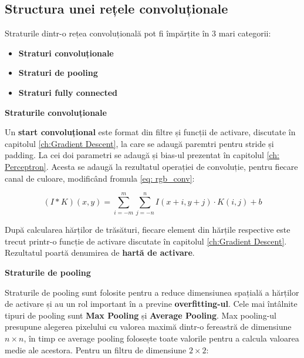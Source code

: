 \subsection{Structura unei rețele convoluționale}

Straturile dintr-o rețea convoluțională pot fi împărțite în 3 mari categorii:

\begin{itemize}
    \item \textbf{Straturi convoluționale}
    \item \textbf{Straturi de pooling}
    \item \textbf{Straturi fully connected}
\end{itemize}

\textbf{Straturile convoluționale}

Un \textbf{start convoluțional} este format din filtre și funcții de activare, discutate în capitolul \ref{ch:Gradient Descent}, la care se adaugă paremtri pentru stride și padding. La cei doi parametri se adaugă și bias-ul prezentat în capitolul \ref{ch: Perceptron}. Acesta se adaugă la rezultatul operației de convoluție, pentru fiecare canal de culoare, modificând fromula \ref{eq: rgb_conv}: 

\begin{equation}
    (I * K)(x, y) = \sum_{i=-m}^{m} \sum_{j=-n}^{n} I(x+i, y+j) \cdot K(i, j) + b
\end{equation}

După calcularea hărților de trăsături, fiecare element din hărțile respective este trecut printr-o funcție de activare discutate în capitolul \ref{ch:Gradient Descent}. Rezultatul poartă denumirea de \textbf{hartă de activare}. 

\textbf{Straturile de pooling}

Straturile de pooling sunt folosite pentru a reduce dimensiunea spațială a hărților de activare și au un rol important în a previne \textbf{overfitting-ul}.  Cele mai întâlnite tipuri de pooling sunt \textbf{Max Pooling} și \textbf{Average Pooling}. Max pooling-ul presupune alegerea pixelului cu valorea maximă dintr-o fereastră de dimensiune $n\times n$, în timp ce average pooling folosește toate valorile pentru a calcula valoarea medie ale acestora. Pentru un filtru de dimensiune $2\times 2$: 

